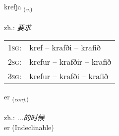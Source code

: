 \documentclass[frontgrid, backgrid]{flacards}\usepackage[]{graphicx}\usepackage[]{xcolor}
\begin{document}
\renewcommand{\flhead}{\vskip5pt \fboxsep=0pt {\small\bfseries\footnotesize Sagnorð | 动词}}
\renewcommand{\fcfoot}{\vskip5pt \fboxsep=0pt \hspace{2pt}{\small\bfseries\footnotesize 1K}}

\renewcommand{\blhead}{\vskip5pt {\small\bfseries\footnotesize Sagnorð | 动词 }}
\renewcommand{\bcfoot}{\vskip5pt \hspace{2pt}{\small\bfseries\footnotesize 1K}}


{krefja \small{\textsubscript{(\textit{v.})}} \\[1ex] %
\textphonetic{[kʰrɛvja]} \\
zh.: \emph{要求} \\  [2ex]
\renewcommand*{\arraystretch}{0.8}
\begin{tabular}{p{1cm}l}
\textsc{1sg}: & kref -- krafði -- krafið \\ 
\textsc{2sg}: & krefur -- krafðir -- krafið \\ 
\textsc{3sg}: & krefur -- krafði -- krafið \\ 
\end{tabular}
}


\renewcommand{\flhead}{\vskip5pt \fboxsep=0pt {\small\bfseries\footnotesize Samtenging | 连词}}
\renewcommand{\fcfoot}{\vskip5pt \fboxsep=0pt \hspace{2pt}{\small\bfseries\footnotesize 1K}}

\renewcommand{\blhead}{\vskip5pt {\small\bfseries\footnotesize Samtenging | 连词 }}
\renewcommand{\bcfoot}{\vskip5pt \hspace{2pt}{\small\bfseries\footnotesize 1K}}


{er \small{\textsubscript{(\textit{conj.})}} \\[1ex]
\textphonetic{[ɛr]} \\
zh.: \emph{...的时候} \\  [2ex]
er (Indeclinable)}

\end{document}

